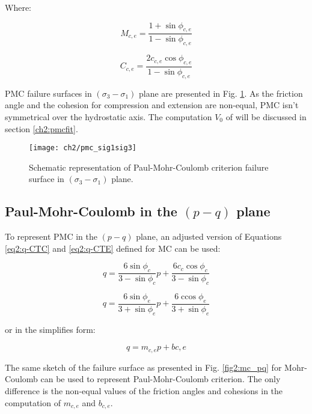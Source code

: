Where:

\begin{equation}\label{eq2:PMC_sig1sig3_Mce}
    M_{c,e} = \frac{1+\sin \phi_{c,e}}{1-\sin \phi_{c,e}}
\end{equation}

\begin{equation}\label{eq2:PMC_sig1sig3_Cce}
    C_{c,e} = \frac{2c_{c,e}\cos \phi_{c,e}}{1-\sin \phi_{c,e}}
\end{equation}

PMC failure surfaces in $(\sigma_3 -\sigma_1)$ plane are presented in Fig. \ref{fig2:pmc_sig1sig3}. As the friction angle and the cohesion for compression and extension are non-equal, PMC isn’t symmetrical over the hydrostatic axis. The computation $V_0$ of  will be discussed in section \ref{ch2:pmcfit}. 


\begin{figure}[tb]
    \centering
    \texttt{[image: ch2/pmc\_sig1sig3]}
    \caption{Schematic representation of Paul-Mohr-Coulomb criterion failure surface in $(\sigma_3 -\sigma_1)$ plane.}
    \label{fig2:pmc_sig1sig3}
\end{figure} 

\subsection{Paul-Mohr-Coulomb in the \texorpdfstring{$(p-q)$}{p-q} plane}

To represent PMC in the $(p-q)$ plane, an adjusted version of Equations \ref{eq2:q-CTC} and \ref{eq2:q-CTE} defined for MC can be used:

\begin{equation}\label{eq2:pmc-q-CTC}
    q=\frac{6 \sin \phi_{c}}{3-\sin \phi_{c}} p+\frac{6 c_{c} \cos \phi_{c}}{3-\sin \phi_{c}}
\end{equation}

\begin{equation}\label{eq2:pmc-q-CTE}
    q=\frac{6 \sin \phi_{e}}{3+\sin \phi_{e}} p+\frac{6 \operatorname{ccos} \phi_{e}}{3+\sin \phi_{e}}
\end{equation}

or in the simplifies form:

\begin{equation}\label{eq2:PMC_pq}
    q = m_{c,e}p+b{c,e}
\end{equation}

The same sketch of the failure surface as presented in Fig. \ref{fig2:mc_pq} for Mohr-Coulomb can be used to represent Paul-Mohr-Coulomb criterion. The only difference is the non-equal values of the friction angles and cohesions in the computation of $m_{c,e}$ and $b_{c,e}$.

